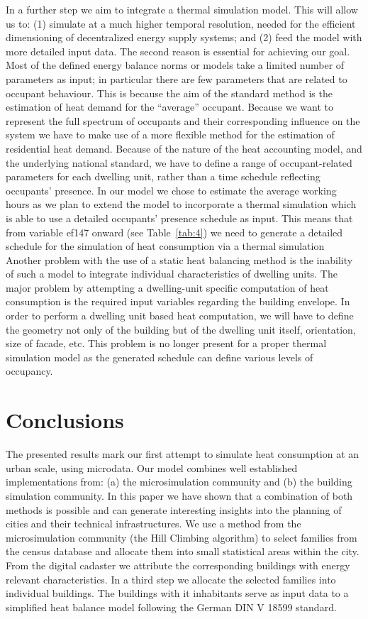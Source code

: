 \documentclass[11pt]{IJM-article}
\begin{document}
In a further step we aim to integrate a thermal simulation model. This will
allow us to: (1) simulate at a much higher temporal resolution, needed for the
efficient dimensioning of decentralized energy supply systems; and (2) feed the
model with more detailed input data. The second reason is essential for
achieving our goal. Most of the defined energy balance norms or models take a
limited number of parameters as input; in particular there are few parameters
that are related to occupant behaviour. This is because the aim of the standard
method is the estimation of heat demand for the ``average'' occupant. Because
we want to represent the full spectrum of occupants and their corresponding
influence on the system we have to make use of a more flexible method for the
estimation of residential heat demand.  Because of the nature of the heat
accounting model, and the underlying national standard, we have to define a
range of occupant-related parameters for each dwelling unit, rather than a time
schedule reflecting occupants' presence. In our model we chose to estimate the
average working hours as we plan to extend the model to incorporate a thermal
simulation which is able to use a detailed occupants’ presence schedule as
input. This means that from variable ef147 onward (see Table~\ref{tab:4}) we
need to generate a detailed schedule for the simulation of heat consumption via
a thermal simulation   Another problem with the
use of a static heat balancing method is the inability of such a model to
integrate individual characteristics of dwelling units. The major problem by
attempting a dwelling-unit specific computation of heat consumption is the
required input variables regarding the building envelope. In order to perform a
dwelling unit based heat computation, we will have to define the geometry not
only of the building but of the dwelling unit itself, orientation, size of
facade, etc. This problem is no longer present for a proper thermal simulation
model as the generated schedule can define various levels of occupancy.

\section{Conclusions}\label{sec:10}

The presented results mark our first attempt to simulate heat consumption at an
urban scale, using microdata. Our model combines well established
implementations from: (a) the microsimulation community and (b) the building
simulation community. In this paper we have shown that a combination of both
methods is possible and can generate interesting insights into the planning of
cities and their technical infrastructures. We use a method from the
microsimulation community (the Hill Climbing algorithm) to select families from
the census database and allocate them into small statistical areas within the
city. From the digital cadaster we attribute the corresponding buildings with
energy relevant characteristics. In a third step we allocate the selected
families into individual buildings. The buildings with it inhabitants serve as
input data to a simplified heat balance model following the German DIN V 18599
standard.
\end{document}
